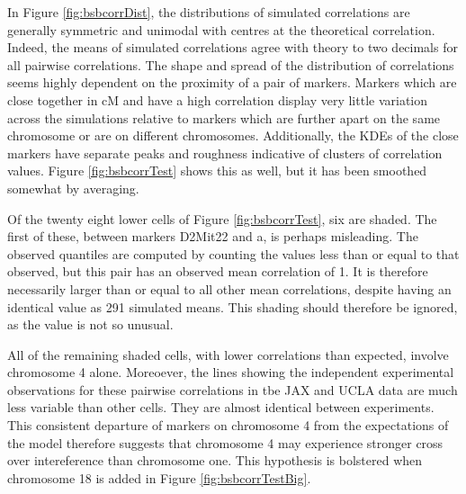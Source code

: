 \documentclass[12pt]{article}
\begin{document}
In Figure \ref{fig:bsbcorrDist}, the distributions of simulated correlations are generally symmetric and unimodal with centres at the theoretical correlation. Indeed, the means of simulated correlations agree with theory to two decimals for all pairwise correlations. The shape and spread of the distribution of correlations seems highly dependent on the proximity of a pair of markers. Markers which are close together in cM and have a high correlation display very little variation across the simulations relative to markers which are further apart on the same chromosome or are on different chromosomes. Additionally, the KDEs of the close markers have separate peaks and roughness indicative of clusters of correlation values. Figure \ref{fig:bsbcorrTest} shows this as well, but it has been smoothed somewhat by averaging.

Of the twenty eight lower cells of Figure \ref{fig:bsbcorrTest}, six are shaded. The first of these, between markers D2Mit22 and a, is perhaps misleading. The observed quantiles are computed by counting the values less than or equal to that observed, but this pair has an observed mean correlation of 1. It is therefore necessarily larger than or equal to all other mean correlations, despite having an identical value as 291 simulated means. This shading should therefore be ignored, as the value is not so unusual.

All of the remaining shaded cells, with lower correlations than expected, involve chromosome 4 alone. Moreoever, the lines showing the independent experimental observations for these pairwise correlations in tbe JAX and UCLA data are much less variable than other cells. They are almost identical between experiments. This consistent departure of markers on chromosome 4 from the expectations of the model therefore suggests that chromosome 4 may experience stronger cross over intereference than chromosome one. This hypothesis is bolstered when chromosome 18 is added in Figure \ref{fig:bsbcorrTestBig}.
\end{document}
